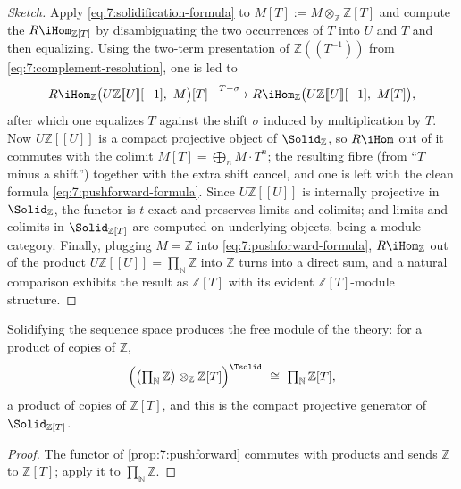\begin{proof}[Sketch]
Apply \eqref{eq:7:solidification-formula} to $M[T]:=M\otimes_{\mathbb{Z}}
\mathbb{Z}[T]$ and compute the $R\iHom_{\mathbb{Z}[T]}$ by disambiguating the
two occurrences of $T$ into $U$ and $T$ and then equalizing. Using the two-term
presentation of $\mathbb{Z}(\!(T^{-1})\!)$ from
\eqref{eq:7:complement-resolution}, one is led to
\begin{equation*}
R\iHom_{\mathbb{Z}}\bigl(U\mathbb{Z}[\![U]\!][-1],\ M\bigr)[T]
\xrightarrow{\ T-\sigma\ }
R\iHom_{\mathbb{Z}}\bigl(U\mathbb{Z}[\![U]\!][-1],\ M[T]\bigr),
\end{equation*}
after which one equalizes $T$ against the shift $\sigma$ induced by
multiplication by $T$. Now $U\mathbb{Z}[\![U]\!]$ is a compact projective object
of $\Solid_{\mathbb{Z}}$, so $R\iHom$ out of it commutes with the colimit
$M[T]=\bigoplus_n M\cdot T^n$; the resulting fibre (from ``$T$ minus a shift'')
together with the extra shift cancel, and one is left with the clean formula
\eqref{eq:7:pushforward-formula}. Since $U\mathbb{Z}[\![U]\!]$ is internally
projective in $\Solid_{\mathbb{Z}}$, the functor is $t$-exact and preserves
limits and colimits; and limits and colimits in $\Solid_{\mathbb{Z}[T]}$ are
computed on underlying objects, being a module category. Finally, plugging
$M=\mathbb{Z}$ into \eqref{eq:7:pushforward-formula}, $R\iHom_{\mathbb{Z}}$ out
of the product $U\mathbb{Z}[\![U]\!]=\prod_{\mathbb{N}}\mathbb{Z}$ into
$\mathbb{Z}$ turns into a direct sum, and a natural comparison exhibits the
result as $\mathbb{Z}[T]$ with its evident $\mathbb{Z}[T]$-module structure.
\end{proof}

\begin{corollary}
\label{cor:7:generator}
Solidifying the sequence space produces the free module of the theory: for a
product of copies of $\mathbb{Z}$,
\begin{equation*}
\Bigl(\bigl(\textstyle\prod_{\mathbb{N}}\mathbb{Z}\bigr)\otimes_{\mathbb{Z}}
\mathbb{Z}[T]\Bigr)^{\Tsolid}\ \cong\ \prod_{\mathbb{N}}\mathbb{Z}[T],
\end{equation*}
a product of copies of $\mathbb{Z}[T]$, and this is the compact projective
generator of $\Solid_{\mathbb{Z}[T]}$.
\end{corollary}

\begin{proof}
The functor of \cref{prop:7:pushforward} commutes with products and sends
$\mathbb{Z}$ to $\mathbb{Z}[T]$; apply it to $\prod_{\mathbb{N}}\mathbb{Z}$.
\end{proof}

